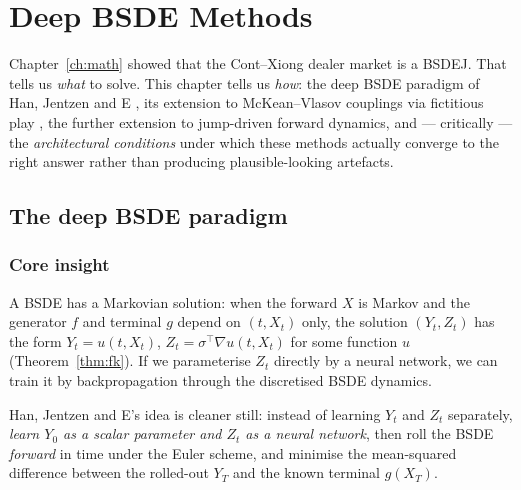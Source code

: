 \chapter{Deep BSDE Methods}
\label{ch:deep-bsde}

Chapter~\ref{ch:math} showed that the Cont--Xiong dealer market is a BSDEJ. That tells us \emph{what} to solve. This chapter tells us \emph{how}: the deep BSDE paradigm of Han, Jentzen and E \cite{han2018}, its extension to McKean--Vlasov couplings via fictitious play \cite{han2022}, the further extension to jump-driven forward dynamics, and --- critically --- the \emph{architectural conditions} under which these methods actually converge to the right answer rather than producing plausible-looking artefacts.

\section{The deep BSDE paradigm}
\label{sec:hje}

\subsection{Core insight}

A BSDE has a Markovian solution: when the forward $X$ is Markov and the generator $f$ and terminal $g$ depend on $(t, X_t)$ only, the solution $(Y_t, Z_t)$ has the form $Y_t = u(t, X_t)$, $Z_t = \sigma^\top \nabla u(t, X_t)$ for some function $u$ (Theorem~\ref{thm:fk}). If we parameterise $Z_t$ directly by a neural network, we can train it by backpropagation through the discretised BSDE dynamics.

Han, Jentzen and E's idea is cleaner still: instead of learning $Y_t$ and $Z_t$ separately, \emph{learn $Y_0$ as a scalar parameter and $Z_t$ as a neural network}, then roll the BSDE \emph{forward} in time under the Euler scheme, and minimise the mean-squared difference between the rolled-out $Y_T$ and the known terminal $g(X_T)$.

